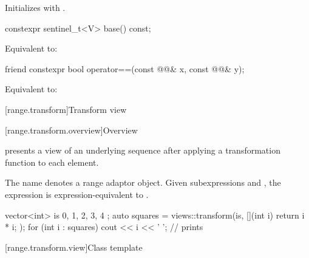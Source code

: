 \begin{itemdescr}
\pnum
\effects
Initializes  with .
\end{itemdescr}

%
\begin{itemdecl}
constexpr sentinel_t<V> base() const;
\end{itemdecl}

\begin{itemdescr}
\pnum
\effects
Equivalent to: 
\end{itemdescr}

%
\begin{itemdecl}
friend constexpr bool operator==(const @@& x, const @@& y);
\end{itemdecl}

\begin{itemdescr}
\pnum
\effects
Equivalent to: 
\end{itemdescr}

[range.transform]{Transform view}

[range.transform.overview]{Overview}

\pnum
{} presents
a view of an underlying sequence after
applying a transformation function to each element.

\pnum
{}%
The name  denotes a
range adaptor object.
Given subexpressions  and , the expression
 is expression-equivalent to
.

\pnum
\begin{example}
\begin{codeblock}
vector<int> is{ 0, 1, 2, 3, 4 };
auto squares = views::transform(is, [](int i) { return i * i; });
for (int i : squares)
  cout << i << ' '; // prints 
\end{codeblock}
\end{example}

[range.transform.view]{Class template }

